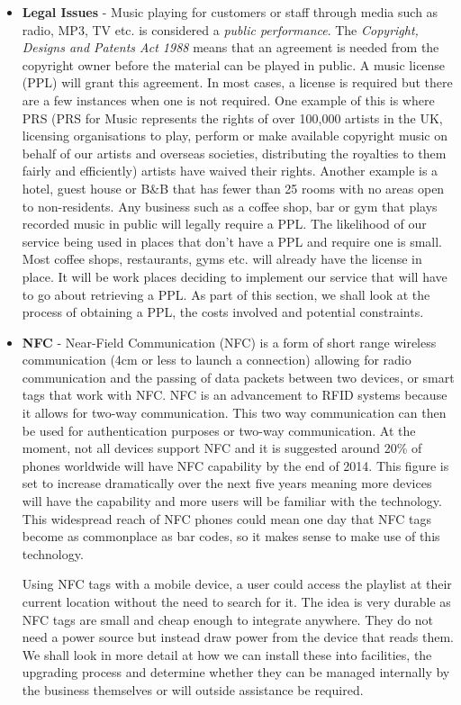 \begin{itemize}
  \item \textbf{Legal Issues} - 
    Music playing for customers or staff through media such as radio, MP3, TV etc. is considered a \emph{public performance}. The \emph{Copyright, Designs and Patents Act 1988} means that an agreement is needed from the copyright owner before the material can be played in public. A music license (PPL) will grant this agreement. In most cases, a license is required but there are a few instances when one is not required. One example of this is where PRS (PRS for Music represents the rights of over 100,000 artists in the UK, licensing organisations to play, perform or make available copyright music on behalf of our artists and overseas societies, distributing the royalties to them fairly and efficiently) artists have waived their rights. Another example is a hotel, guest house or B\&B that has fewer than 25 rooms with no areas open to non-residents. 
    Any business such as a coffee shop, bar or gym that plays recorded music in public will legally require a PPL. The likelihood of our service being used in places that don't have a PPL and require one is small. Most coffee shops, restaurants, gyms etc. will already have the license in place. It will be work places deciding to implement our service that will have to go about retrieving a PPL. As part of this section, we shall look at the process of obtaining a PPL, the costs involved and potential constraints.

  \item \textbf{NFC} - 
    Near-Field Communication (NFC) is a form of short range wireless communication (4cm or less to launch a connection) allowing for radio communication and the passing of data packets between two devices, or smart tags that work with NFC. NFC is an advancement to RFID systems because it allows for two-way communication. This two way communication can then be used for authentication purposes or two-way communication. 
    At the moment, not all devices support NFC and it is suggested around 20\% of phones worldwide will have NFC capability by the end of 2014. This figure is set to increase dramatically over the next five years meaning more devices will have the capability and more users will be familiar with the technology. This widespread reach of NFC phones could mean one day that NFC tags become as commonplace as bar codes, so it makes sense to make use of this technology.

    Using NFC tags with a mobile device, a user could access the playlist at their current location without the need to search for it. The idea is very durable as NFC tags are small and cheap enough to integrate anywhere. They do not need a power source but instead draw power from the device that reads them. 
    We shall look in more detail at how we can install these into facilities, the upgrading process and determine whether they can be managed internally by the business themselves or will outside assistance be required.
\end{itemize}